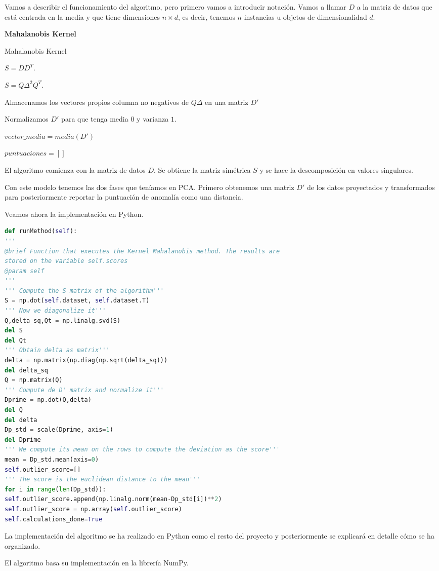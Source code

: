 Vamos a describir el funcionamiento del algoritmo, pero primero vamos a introducir notación. Vamos a llamar $D$ a la matriz de datos que está centrada en la media y que tiene dimensiones $n\times d$, es decir, tenemos $n$ instancias u objetos de dimensionalidad $d$.

\begin{algorithm}{\textbf{Mahalanobis Kernel}}
	\caption{Mahalanobis Kernel}
	\label{mahalanobis_kernel}
	
	$S = DD^T$.
	
	$S = Q\Delta^2 Q^T$.
	
	Almacenamos los vectores propios columna no negativos de $Q\Delta$ en una matriz $D'$
	
	Normalizamos $D'$ para que tenga media $0$ y varianza $1$.
	
	$vector\_media = media(D')$
	
	$puntuaciones = []$
	
\end{algorithm}

El algoritmo comienza con la matriz de datos $D$. Se obtiene la matriz simétrica $S$ y se hace la descomposición en valores singulares. 

Con este modelo tenemos las dos fases que teníamos en PCA. Primero obtenemos una matriz $D'$ de los datos proyectados y transformados para posteriormente reportar la puntuación de anomalía como una distancia.

Veamos ahora la implementación en Python.

\begin{lstlisting}[language=Python]
def runMethod(self):
'''
@brief Function that executes the Kernel Mahalanobis method. The results are
stored on the variable self.scores
@param self
'''
''' Compute the S matrix of the algorithm'''
S = np.dot(self.dataset, self.dataset.T)
''' Now we diagonalize it'''
Q,delta_sq,Qt = np.linalg.svd(S)
del S
del Qt
''' Obtain delta as matrix'''
delta = np.matrix(np.diag(np.sqrt(delta_sq)))
del delta_sq
Q = np.matrix(Q)
''' Compute de D' matrix and normalize it'''
Dprime = np.dot(Q,delta)
del Q
del delta
Dp_std = scale(Dprime, axis=1)
del Dprime
''' We compute its mean on the rows to compute the deviation as the score'''
mean = Dp_std.mean(axis=0)
self.outlier_score=[]
''' The score is the euclidean distance to the mean'''
for i in range(len(Dp_std)):
self.outlier_score.append(np.linalg.norm(mean-Dp_std[i])**2)
self.outlier_score = np.array(self.outlier_score)
self.calculations_done=True
\end{lstlisting}

La implementación del algoritmo se ha realizado en Python como el resto del proyecto y posteriormente se explicará en detalle cómo se ha organizado.

El algoritmo basa su implementación en la librería NumPy.
